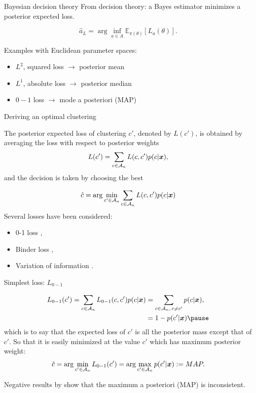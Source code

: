 \begin{frame}{Bayesian decision theory}
	From decision theory: a Bayes estimator minimizes a posterior expected loss.
	
\begin{equation*}
\hat{a}_L = \arg \inf_{a \in A} \mathbb{E}_{\pi(\theta)}[L_a(\theta)].
\end{equation*}\pause

Examples with Euclidean parameter spaces:
\begin{itemize}
	\item $L^2$, squared loss $\longrightarrow$ posterior mean
	\item $L^1$, absolute loss $\longrightarrow$ posterior median
	\item $0-1$ loss  $\longrightarrow$ mode a posteriori (MAP)
\end{itemize}
\end{frame}

\begin{frame}{Deriving an optimal clustering}

The posterior expected loss of clustering $c'$, denoted by $L(c')$, is obtained by \alert{averaging the loss with respect to posterior weights}
$$L(c') = \sum_{c\in\mathcal{A}_n} L(c,c')p(c|\boldsymbol{x}),$$
and the decision is taken by choosing the best

\begin{equation*}
\hat c = \arg \min_{c' \in \mathcal{A}_n} \sum_{c\in\mathcal{A}_n} L(c,c')p(c|\boldsymbol{x})
\end{equation*}\pause
Several losses have been considered:
	\begin{itemize}
		\item 0-1 loss \citep{rajkowski2019analysis},
		\item Binder loss \citep{dahl2006model},
		\item Variation of information \citep{wade2018bayesian}.
	\end{itemize}
\end{frame}

\begin{frame}{Simplest loss: $L_{0-1}$}

\begin{align*}
	L_{0-1}(c') = \sum_{c\in\Ac_n} L_{0-1}(c,c')p(c|\bx) &= \sum_{c\in\Ac_n,\,c\neq c'} p(c|\bx),\\
	& = 1 - p(c'|\bx)\pause
\end{align*}
which is to say that the expected loss of $c'$ is \alert{all the posterior mass except that of $c'$.} So that it is easily minimized at the value $c'$ which has \alert{maximum} posterior weight:
$$\hat c =  \arg \min_{c' \in \mathcal{A}_n} L_{0-1}(c') =   \arg \max_{c' \in \mathcal{A}_n} p(c'|\boldsymbol{x}):= MAP.$$\pause

Negative results by \citet{rajkowski2019analysis} show that the \alert{maximum a posteriori (MAP) is inconsistent}.
	
\end{frame}

